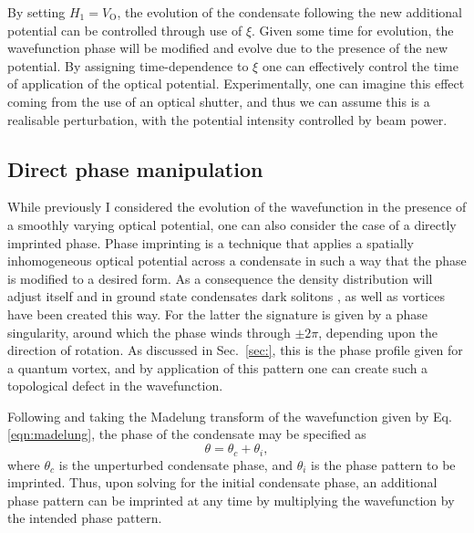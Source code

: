 By setting $H_1 = V_{\textrm{O}}$, the evolution of the condensate following the new additional potential can be controlled through use of $\xi$. Given some time for evolution, the wavefunction phase will be modified and evolve due to the presence of the new potential. By assigning time-dependence to $\xi$ one can effectively control the time of application of the optical potential. Experimentally, one can imagine this effect coming from the use of an optical shutter, and thus we can assume this is a realisable perturbation, with the potential intensity controlled by beam power.

\subsection{Direct phase manipulation}\label{sec:phase}

While previously I considered the evolution of the wavefunction in the presence of a smoothly varying optical potential, one can also consider the case of a directly imprinted phase. Phase imprinting is a technique that applies a spatially inhomogeneous optical potential across a condensate in such a way that the phase is modified to a desired form. As a consequence the density distribution will adjust itself and in ground state condensates dark solitons \cite{BEC:Denschlag_science_2000}, as well as vortices \cite{Vtx:Dobrek_pra_1999} have been created this way. For the latter the signature is given by a phase singularity, around which the phase winds through $\pm 2\pi$, depending upon the direction of rotation. As discussed in Sec.~\ref{sec:}, this is the phase profile given for a quantum vortex, and by application of this pattern one can create such a topological defect in the wavefunction.

Following \cite{BK:Pitaevskii_Stringari_2003} and taking the Madelung transform of the wavefunction given by Eq. \eqref{eqn:madelung}, the phase of the condensate may be specified as
\begin{equation}
\theta = \theta_c + \theta_i,
\end{equation}
where $\theta_c$ is the unperturbed condensate phase, and $\theta_i$ is the phase pattern to be imprinted. Thus, upon solving for the initial condensate phase, an additional phase pattern can be imprinted at any time by multiplying the wavefunction by the intended phase pattern.

